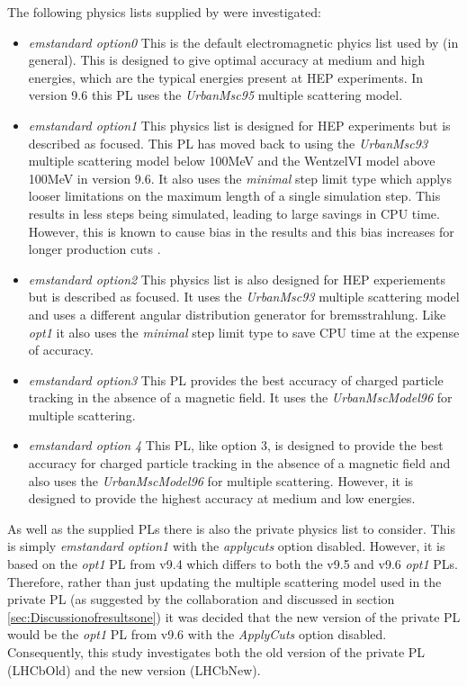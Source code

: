The following physics lists supplied by \geant were investigated:
\begin{itemize}
\item \textit{emstandard option0}
  This is the default electromagnetic phyics list used by \geant (in general).  This is designed to give optimal accuracy at medium and high energies, which are the typical energies present at HEP experiments.  In version 9.6 this PL uses the \textit{UrbanMsc95} multiple scattering model.
\item \textit{emstandard option1}
  This physics list is designed for HEP experiments but is described as \cms focused. This PL has moved back to using the \textit{UrbanMsc93} multiple scattering model below 100MeV and the WentzelVI model above 100MeV in version 9.6.  It also uses the \textit{minimal} step limit type which applys looser limitations on the maximum length of a single simulation step.  This results in less steps being simulated, leading to large savings in CPU time.  However, this is known to cause bias in the results and this bias increases for longer production cuts \cite{1742-6596-219-3-032045}.
\item \textit{emstandard option2}
  This physics list is also designed for HEP experiements but is described as \lhcb focused.  It uses the \textit{UrbanMsc93} multiple scattering model and uses a different angular distribution generator for bremsstrahlung.  Like \textit{opt1} it also uses the \textit{minimal} step limit type to save CPU time at the expense of accuracy.
\item \textit{emstandard option3}
  This PL provides the best accuracy of charged particle tracking in the absence of a magnetic field.  It uses the \textit{UrbanMscModel96} for multiple scattering.
\item \textit{emstandard option 4}
  This PL, like option 3, is designed to provide the best accuracy for charged particle tracking in the absence of a magnetic field and also uses the \textit{UrbanMscModel96} for multiple scattering.  However, it is designed to provide the highest accuracy at medium and low energies.
\end{itemize}

As well as the \geant supplied PLs there is also the \lhcb private physics list to consider.  This is simply \textit{emstandard option1} with the \textit{applycuts} option disabled.  However, it is based on the \textit{opt1} PL from \geant v9.4 which differs to both the v9.5 and v9.6 \textit{opt1} PLs.  Therefore, rather than just updating the multiple scattering model used in the \lhcb private PL (as suggested by the \geant collaboration  and discussed in section \ref{sec:Discussionofresultsone}) it was decided that the new version of the \lhcb private PL would be the \textit{opt1} PL from v9.6 with the \textit{ApplyCuts} option disabled. Consequently, this study investigates both the old version of the \lhcb private PL (LHCbOld) and the new version (LHCbNew).

